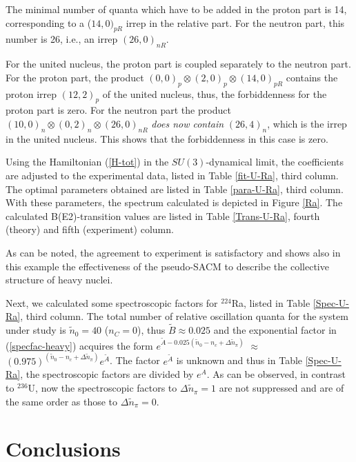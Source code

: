 \documentclass[12pt]{article}
\begin{document}
The minimal number of quanta which have to be added in the proton part is 14, 
corresponding to a ($14,0)_{p R}$ 
irrep in the relative part. For the neutron part, this number is 26, i.e.,
an irrep $(26,0)_{n R}$.

For the united nucleus, 
the proton part is coupled separately to the neutron part. For the proton part, the product
$(0,0)_p \otimes (2,0)_p \otimes (14,0)_{p R}$ contains the proton irrep $(12,2)_p$
of the united nucleus, thus, the forbiddenness for the proton part is zero. 
For the neutron part the product $(10,0)_n \otimes (0,2)_n \otimes (26,0)_{n R}$
{\it does now contain} $(26,4)_n$, which is the irrep in the united nucleus.
This shows that the forbiddenness in this case is zero.

Using the Hamiltonian (\ref{H-tot}) in the $SU(3)$-dynamical limit, the coefficients are adjusted to 
the experimental data, listed in Table \ref{fit-U-Ra}, third column. The optimal parameters obtained are listed in
Table \ref{para-U-Ra}, third column. 
With these parameters, the spectrum calculated is depicted in Figure \ref{Ra}.
The calculated B(E2)-transition values are listed in Table \ref{Trans-U-Ra}, 
fourth (theory) and fifth (experiment) column. 

As can be noted, the agreement to experiment is satisfactory and shows 
also in this example the effectiveness of the
pseudo-SACM to describe the collective structure of heavy nuclei.

Next, we calculated some spectroscopic factors for $^{224}$Ra, listed in Table \ref{Spec-U-Ra},
third column. The total number of relative oscillation
quanta for the system under study is ${\tilde n}_0=40$ ($n_C=0$), 
thus $\widetilde{B} \approx 0.025$ and the exponential
factor in (\ref{specfac-heavy}) acquires the form 
$e^{\widetilde{A}-0.025({\tilde n}_0-n_c+\Delta{\tilde n}_\pi )}$
$\approx$ $(0.975)^{({\tilde n}_0-n_c+\Delta{\tilde n}_\pi )}e^{\widetilde{A}}$. 
The factor $e^{\widetilde{A}}$ is unknown and thus
in Table \ref{Spec-U-Ra}, the spectroscopic factors are divided by $e^A$. 
As can be observed, in contrast to $^{236}$U, now 
the spectroscopic factors to $\Delta {\tilde n}_\pi = 1$ are not suppressed
and are of the same order as those to $\Delta {\tilde n}_\pi = 0$. 



\section{Conclusions}
\label{conclusions}
\end{document}
